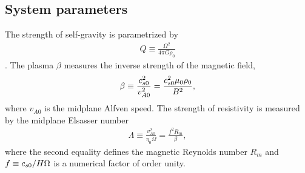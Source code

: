 \subsection{System parameters}
The strength of self-gravity is parametrized by
\begin{align}
  Q \equiv \frac{\Omega^2}{4\pi G\rho_0}
\end{align}
\citep{mamat10}. The plasma $\beta$ measures the inverse strength of
the magnetic field,
\begin{align}
  \beta \equiv \frac{c_{s0}^2}{v_{A0}^2} =
  \frac{c_{s0}^2\mu_0\rho_0}{B^2},  
\end{align}
where $v_{A0}$ is the midplane Alfven speed. The strength of
resistivity is measured by the midplane Elsasser number 
\begin{align}
  \Lambda \equiv \frac{v_{A0}^2}{\eta_0\Omega} = \frac{f^2 R_m}{\beta}, 
\end{align}
where the second equality defines the magnetic Reynolds number $R_m$
and $f\equiv c_{s0}/H\Omega$ is a numerical factor of order unity.  



